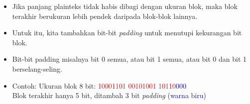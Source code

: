 \documentclass{article}
\begin{document}

\begin{itemize}
    \item Jika panjang plainteks tidak habis dibagi dengan ukuran blok, maka blok terakhir berukuran lebih pendek daripada blok-blok lainnya.
    \item Untuk itu, kita tambahkan bit-bit \textit{padding} untuk menutupi kekurangan bit blok.
    \item Bit-bit padding misalnya bit 0 semua, atau bit 1 semua, atau bit 0 dan bit 1 berselang-seling.
    \item Contoh: Ukuran blok 8 bit: \textcolor{red}{10001101} \textcolor{red}{00101001} \textcolor{red}{10110}\textcolor{blue}{000}\\
    Blok terakhir hanya 5 bit, ditambah 3 bit \textit{padding} (\textcolor{blue}{warna biru})
\end{itemize}
\end{document}
